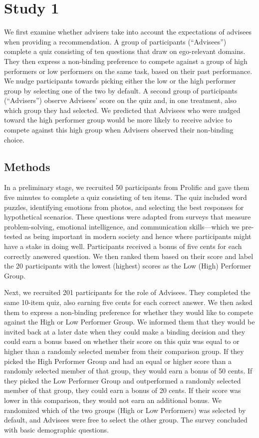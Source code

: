 \documentclass[
  man,
  floatsintext,
  longtable,
  nolmodern,
  notxfonts,
  notimes,
  colorlinks=true,linkcolor=blue,citecolor=blue,urlcolor=blue]{apa7}
\begin{document}
\section{Study 1}\label{study-1}

We first examine whether advisers take into account the expectations of
advisees when providing a recommendation. A group of participants
(``Advisees'') complete a quiz consisting of ten questions that draw on
ego-relevant domains. They then express a non-binding preference to
compete against a group of high performers or low performers on the same
task, based on their past performance. We nudge participants towards
picking either the low or the high performer group by selecting one of
the two by default. A second group of participants (``Advisers'')
observe Advisees' score on the quiz and, in one treatment, also which
group they had selected. We predicted that Advisees who were nudged
toward the high performer group would be more likely to receive advice
to compete against this high group when Advisers observed their
non-binding choice.

\subsection{Methods}\label{methods}

In a preliminary stage, we recruited 50 participants from Prolific and
gave them five minutes to complete a quiz consisting of ten items. The
quiz included word puzzles, identifying emotions from photos, and
selecting the best responses for hypothetical scenarios. These questions
were adapted from surveys that measure problem-solving, emotional
intelligence, and communication skills---which we pre-tested as being
important in modern society and hence where participants might have a
stake in doing well. Participants received a bonus of five cents for
each correctly answered question. We then ranked them based on their
score and label the 20 participants with the lowest (highest) scores as
the Low (High) Performer Group.

Next, we recruited 201 participants for the role of Advisees. They
completed the same 10-item quiz, also earning five cents for each
correct answer. We then asked them to express a non-binding preference
for whether they would like to compete against the High or Low Performer
Group. We informed them that they would be invited back at a later date
when they could make a binding decision and they could earn a bonus
based on whether their score on this quiz was equal to or higher than a
randomly selected member from their comparison group. If they picked the
High Performer Group and had an equal or higher score than a randomly
selected member of that group, they would earn a bonus of 50 cents. If
they picked the Low Performer Group and outperformed a randomly selected
member of that group, they could earn a bonus of 20 cents. If their
score was lower in this comparison, they would not earn an additional
bonus. We randomized which of the two groups (High or Low Performers)
was selected by default, and Advisees were free to select the other
group. The survey concluded with basic demographic questions.
\end{document}
